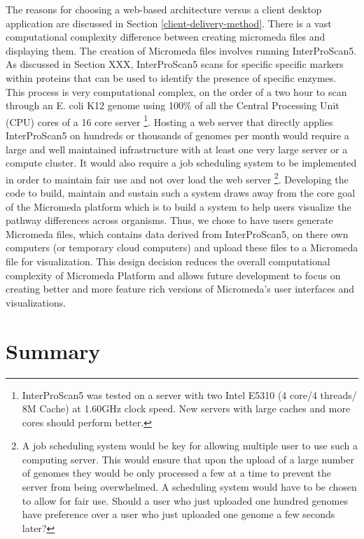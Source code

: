 The reasons for choosing a web-based architecture versus a client desktop application are discussed in Section \ref{client-delivery-method}. There is a vast computational complexity difference between creating micromeda files and displaying them. The creation of Micromeda files involves running InterProScan5. As discussed in Section XXX, InterProScan5 scans for specific specific markers within proteins that can be used to identify the presence of specific enzymes. This process is very computational complex, on the order of a two hour to scan through an E. coli K12 genome using 100\% of all the Central Processing Unit (CPU) cores of a 16 core server \footnote{InterProScan5 was tested on a server with two Intel E5310 (4 core/4 threads/ 8M Cache) at 1.60GHz clock speed. New servers with large caches and more cores should perform better.}. Hosting a web server that directly applies InterProScan5 on hundreds or thousands of genomes per month would require a large and well maintained infrastructure with at least one very large server or a compute cluster. It would also require a job scheduling system to be implemented in order to maintain fair use and not over load the web server \footnote{A job scheduling system would be key for allowing multiple user to use such a computing server. This would ensure that upon the upload of a large number of genomes they would be only processed a few at a time to prevent the server from being overwhelmed. A scheduling system would have to be chosen to allow for fair use. Should a user who just uploaded one hundred genomes have preference over a user who just uploaded one genome a few seconds later?}. Developing the code to build, maintain and sustain such a system draws away from the core goal of the Micromeda platform which is to build a system to help users visualize the pathway differences across organisms. Thus, we chose to have users generate Micromeda files, which contains data derived from InterProScan5, on there own computers (or temporary cloud computers) and upload these files to a Micromeda file for visualization. This design decision reduces the overall computational complexity of Micromeda Platform and allows future development to focus on creating better and more feature rich versions of Micromeda's user interfaces and visualizations.

\section{Summary}

